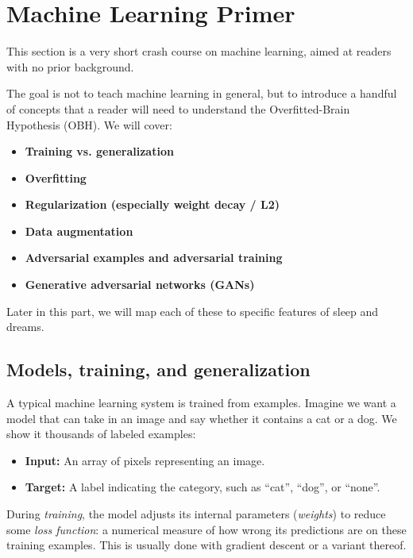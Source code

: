 \section{Machine Learning Primer}\label{sec:ml}

This section is a very short crash course on machine learning, aimed at readers with no prior background.

The goal is not to teach machine learning in general, but to introduce a handful of concepts that a reader will need to understand the Overfitted-Brain Hypothesis (OBH). We will cover:

\begin{itemize}
    \item \textbf{Training vs. generalization}
    \item \textbf{Overfitting}
    \item \textbf{Regularization (especially weight decay / L2)}
    \item \textbf{Data augmentation}
    \item \textbf{Adversarial examples and adversarial training}
    \item \textbf{Generative adversarial networks (GANs)}
\end{itemize}

Later in this part, we will map each of these to specific features of sleep and dreams.


\subsection{Models, training, and generalization}\label{sec:ml_models_training_generalization}

A typical machine learning system is trained from examples. Imagine we want a model that can take in an image and say whether it contains a cat or a dog. We show it thousands of labeled examples:

\begin{itemize}
    \item \textbf{Input:} An array of pixels representing an image.
    \item \textbf{Target:} A label indicating the category, such as ``cat'', ``dog'', or ``none''.
\end{itemize}

During \emph{training}, the model adjusts its internal parameters (\emph{weights}) to reduce some \emph{loss function}: a numerical measure of how wrong its predictions are on these training examples. This is usually done with gradient descent or a variant thereof.

